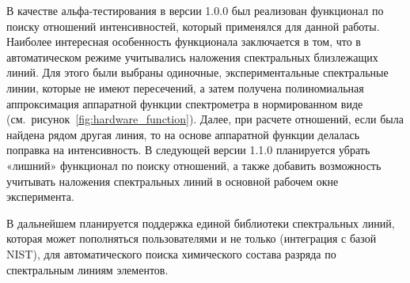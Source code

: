 В качестве альфа-тестирования в версии 1.0.0 был реализован функционал по поиску отношений интенсивностей,
который применялся для данной работы. Наиболее интересная особенность функционала заключается в том, что
в автоматическом режиме учитывались наложения спектральных близлежащих линий. Для этого были выбраны одиночные,
экспериментальные спектральные линии, которые не имеют пересечений, а затем получена полиномиальная
аппроксимация аппаратной функции спектрометра в нормированном виде (см.~рисунок~\ref{fig:hardware_function}).
Далее, при расчете отношений, если была найдена рядом другая линия, то на основе аппаратной функции делалась
поправка на интенсивность. В следующей версии 1.1.0 планируется убрать «лишний» функционал по поиску отношений,
а также добавить возможность учитывать наложения спектральных линий в основной рабочем окне эксперимента.

В дальнейшем планируется поддержка единой библиотеки спектральных линий, которая может пополняться пользователями и
не только (интеграция с базой NIST), для автоматического поиска химического состава разряда по спектральным линиям
элементов.
